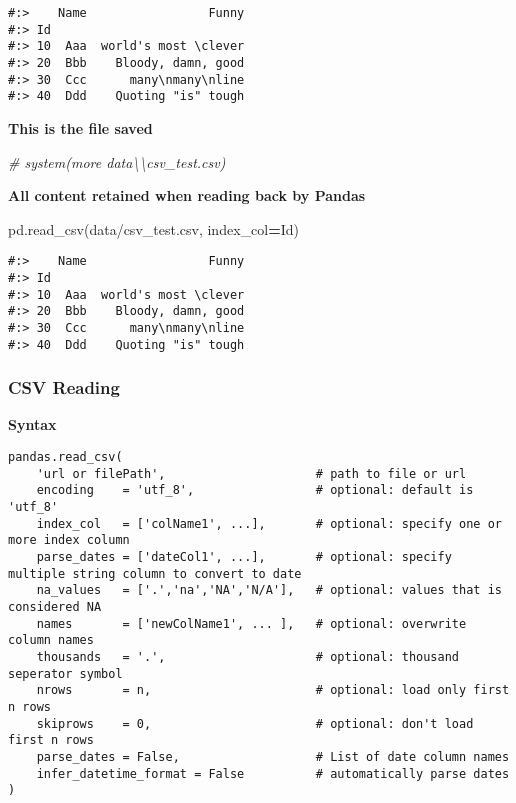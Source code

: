 \documentclass[
]{book}
\newenvironment{Shaded}{\begin{snugshade}}{\end{snugshade}}
\newcommand{\CommentTok}[1]{\textcolor[rgb]{0.37,0.37,0.37}{\textit{#1}}}
\newcommand{\NormalTok}[1]{#1}
\newcommand{\OperatorTok}[1]{\textcolor[rgb]{0.43,0.43,0.43}{\textbf{#1}}}
\newcommand{\StringTok}[1]{\textcolor[rgb]{0.5,0.5,0.5}{#1}}
\begin{document}
\begin{verbatim}
#:>    Name                 Funny
#:> Id                           
#:> 10  Aaa  world's most \clever
#:> 20  Bbb    Bloody, damn, good
#:> 30  Ccc      many\nmany\nline
#:> 40  Ddd    Quoting "is" tough
\end{verbatim}

\textbf{This is the file saved}

\begin{Shaded}
\begin{Highlighting}[]
\CommentTok{\# system(\textquotesingle{}more data\textbackslash{}\textbackslash{}csv\_test.csv\textquotesingle{})}
\end{Highlighting}
\end{Shaded}

\textbf{All content retained when reading back by Pandas}

\begin{Shaded}
\begin{Highlighting}[]
\NormalTok{pd.read\_csv(}\StringTok{\textquotesingle{}data/csv\_test.csv\textquotesingle{}}\NormalTok{, index\_col}\OperatorTok{=}\StringTok{\textquotesingle{}Id\textquotesingle{}}\NormalTok{)}
\end{Highlighting}
\end{Shaded}

\begin{verbatim}
#:>    Name                 Funny
#:> Id                           
#:> 10  Aaa  world's most \clever
#:> 20  Bbb    Bloody, damn, good
#:> 30  Ccc      many\nmany\nline
#:> 40  Ddd    Quoting "is" tough
\end{verbatim}

\hypertarget{csv-reading}{%
\subsubsection{CSV Reading}\label{csv-reading}}

\textbf{Syntax}

\begin{verbatim}
pandas.read_csv( 
    'url or filePath',                     # path to file or url 
    encoding    = 'utf_8',                 # optional: default is 'utf_8'
    index_col   = ['colName1', ...],       # optional: specify one or more index column
    parse_dates = ['dateCol1', ...],       # optional: specify multiple string column to convert to date
    na_values   = ['.','na','NA','N/A'],   # optional: values that is considered NA
    names       = ['newColName1', ... ],   # optional: overwrite column names
    thousands   = '.',                     # optional: thousand seperator symbol
    nrows       = n,                       # optional: load only first n rows
    skiprows    = 0,                       # optional: don't load first n rows
    parse_dates = False,                   # List of date column names
    infer_datetime_format = False          # automatically parse dates
)
\end{verbatim}
\end{document}
